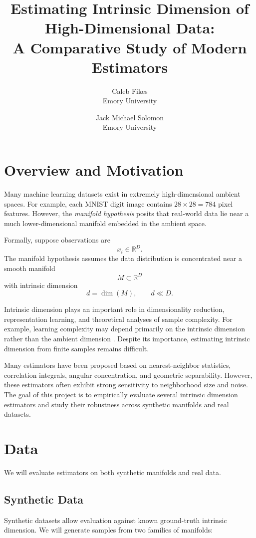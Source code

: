 \documentclass[11pt]{article}
\title{Estimating Intrinsic Dimension of High-Dimensional Data:\\
A Comparative Study of Modern Estimators}
\author{
Caleb Fikes \\
Emory University
\and
Jack Michael Solomon \\
Emory University
}
\date{}
\begin{document}
\maketitle

\section*{Overview and Motivation}

Many machine learning datasets exist in extremely high-dimensional ambient spaces. For example, each MNIST digit image contains $28\times 28 = 784$ pixel features. However, the \emph{manifold hypothesis} posits that real-world data lie near a much lower-dimensional manifold embedded in the ambient space.

Formally, suppose observations are
\[
x_i \in \mathbb{R}^D.
\]
The manifold hypothesis assumes the data distribution is concentrated near a smooth manifold
\[
M \subset \mathbb{R}^D
\]
with intrinsic dimension
\[
d = \dim(M), \qquad d \ll D.
\]

Intrinsic dimension plays an important role in dimensionality reduction, representation learning, and theoretical analyses of sample complexity. For example, learning complexity may depend primarily on the intrinsic dimension rather than the ambient dimension \cite{narayanan2010}. Despite its importance, estimating intrinsic dimension from finite samples remains difficult.

Many estimators have been proposed based on nearest-neighbor statistics, correlation integrals, angular concentration, and geometric separability. However, these estimators often exhibit strong sensitivity to neighborhood size and noise. The goal of this project is to empirically evaluate several intrinsic dimension estimators and study their robustness across synthetic manifolds and real datasets.

\section*{Data}

We will evaluate estimators on both synthetic manifolds and real data.

\subsection*{Synthetic Data}

Synthetic datasets allow evaluation against known ground-truth intrinsic dimension. 
We will generate samples from two families of manifolds:
\end{document}
